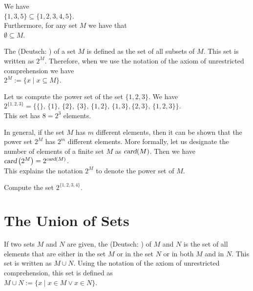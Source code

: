 \exampleEng
We have
\\[0.2cm]
\hspace*{1.3cm}
$\{ 1, 3, 5\} \subseteq \{ 1, 2, 3, 4, 5 \}$.
\\[0.2cm]
Furthermore, for any set $M$ we have that
\\[0.2cm]
\hspace*{1.3cm}
$\emptyset \subseteq M$. \eox
\vspace*{0.2cm}

The   (Deutsch: ) of a set $M$ is defined as the set of all subsets of $M$.  
 
This set is written as $2^M$.  Therefore, when we use the notation of the axiom of unrestricted comprehension we have
\\[0.2cm] 
\hspace*{1.3cm}
$2^M := \{ x \;|\; x \subseteq M \}$.

\exampleEng
Let us compute the power set of the set $\{1,2,3\}$.  We have \\[0.2cm]
\hspace*{1.3cm}
 $2^{\{1,2,3\}} = \bigl\{ \{\},\, \{1\}, \, \{2\},\, \{3\},\, \{1,2\}, \, \{1,3\}, \{2,3\}, \,\{1,2,3\}\bigr\}$. 
\\[0.2cm]
This set has $8 = 2^3$ elements.  
\eox

In general, if the set $M$ has $m$ different elements, then it can be shown
that the power set $2^M$ has $2^m$ different elements.
More formally, let us designate the number of elements of a finite set $M$ as 
$\textsl{card}(M)$.  Then we have
\\[0.2cm]
\hspace*{1.3cm}
$\textsl{card}\left(2^M\right) = 2^{\textsl{\scriptsize card}(M)}$.
\\[0.2cm]
This explains the notation $2^M$ to denote the power set of $M$.  

\exerciseEng
Compute the set $2^{\{1,2,3,4\}}$.  
\eox

\section{The Union of Sets}
If two sets $M$ and $N$ are given, the  (Deutsch: )
 
of $M$ and $N$ is the set of all elements that are either in the set $M$ or in the set $N$ or in both $M$ and
in $N$.  This set is written as $M \cup N$.
Using the notation of the axiom of unrestricted comprehension, this set is defined as 
\\[0.2cm]
\hspace*{1.3cm} $M \cup N := \{ x \;|\; x \in M \vee x \in N \}$. 

